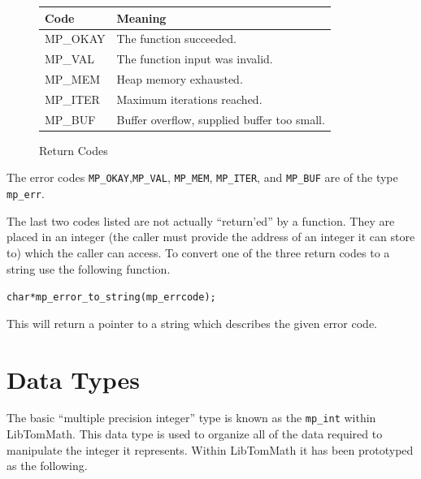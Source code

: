 \documentclass[synpaper]{book}
\begin{document}
\begin{figure}[h!]
  \begin{center}
    \begin{small}
      \begin{tabular}{|l|l|}
        \hline \textbf{Code} & \textbf{Meaning}                            \\
        \hline MP\_OKAY      & The function succeeded.                     \\
        \hline MP\_VAL       & The function input was invalid.             \\
        \hline MP\_MEM       & Heap memory exhausted.                      \\
        \hline MP\_ITER      & Maximum iterations reached.                 \\
        \hline MP\_BUF       & Buffer overflow, supplied buffer too small. \\
        \hline
      \end{tabular}
    \end{small}
  \end{center}
  \caption{Return Codes}
\end{figure}

The error codes \texttt{MP\_OKAY},\texttt{MP\_VAL}, \texttt{MP\_MEM}, \texttt{MP\_ITER}, and
\texttt{MP\_BUF} are of the type \texttt{mp\_err}.

The last two codes listed are not actually ``return'ed'' by a function.  They are placed in an
integer (the caller must provide the address of an integer it can store to) which the caller can
access.  To convert one of the three return codes to a string use the following function.

\begin{alltt}
char *mp_error_to_string(mp_err code);
\end{alltt}

This will return a pointer to a string which describes the given error code.

\section{Data Types}
The basic ``multiple precision integer'' type is known as the \texttt{mp\_int} within LibTomMath.
This data type is used to organize all of the data required to manipulate the integer it
represents.  Within LibTomMath it has been prototyped as the following.
\end{document}
